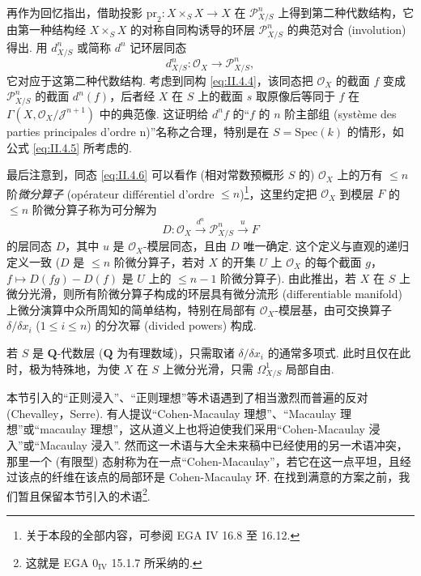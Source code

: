 \begin{remark}
再作为回忆指出，借助投影 $\mathrm{pr}_2 \colon X \times_S X \to X$ 在 $\mathcal{P}_{X/S}^{n}$ 上得到第二种代数结构，它由第一种结构经 $X \times_S X$ 的对称自同构诱导的环层 $\mathcal{P}_{X/S}^{n}$ 的典范对合 (involution) 得出. 用 $d_{X/S}^{n}$ 或简称 $d^n$ 记环层同态
\begin{equation}
d_{X/S}^{n} \colon \mathcal{O}_X \longrightarrow \mathcal{P}_{X/S}^{n}, \tag{4.6}
\label{eq:II.4.6}
\end{equation}
它对应于这第二种代数结构. 考虑到同构 \eqref{eq:II.4.4}，该同态把 $\mathcal{O}_X$ 的截面 $f$ 变成 $\mathcal{P}_{X/S}^{n}$ 的截面 $d^n(f)$，后者经 $X$ 在 $S$ 上的截面 $s$ 取原像后等同于 $f$ 在 $\Gamma(X, \mathcal{O}_X/\mathcal{J}^{n+1})$ 中的典范像. 这证明给 $d^n f$ 的``$f$ 的 $n$ 阶主部组 (système des parties principales d'ordre n)''名称之合理，特别是在 $S = \mathrm{Spec}(k)$ 的情形，如公式 \eqref{eq:II.4.5} 所考虑的.

最后注意到，同态 \eqref{eq:II.4.6} 可以看作 (相对常数预概形 $S$ 的) $\mathcal{O}_X$ 上的万有 $\leqslant n$ 阶\emph{微分算子} (opérateur différentiel d'ordre $\leqslant n$)\footnote{关于本段的全部内容，可参阅 EGA IV 16.8 至 16.12.}，这里约定把 $\mathcal{O}_X$ 到模层 $F$ 的 $\leqslant n$ 阶微分算子称为可分解为
\[
D \colon \mathcal{O}_X \xrightarrow{d^n} \mathcal{P}_{X/S}^{n} \xrightarrow{u} F
\]
的层同态 $D$，其中 $u$ 是 $\mathcal{O}_X$-模层同态，且由 $D$ 唯一确定. 这个定义与直观的递归定义一致 ($D$ 是 $\leqslant n$ 阶微分算子，若对 $X$ 的开集 $U$ 上 $\mathcal{O}_X$ 的每个截面 $g$，$f \mapsto D(fg) - D(f)$ 是 $U$ 上的 $\leqslant n-1$ 阶微分算子). 由此推出，若 $X$ 在 $S$ 上微分光滑，则所有阶微分算子构成的环层具有微分流形 (differentiable manifold) 上微分演算中众所周知的简单结构，特别在局部有 $\mathcal{O}_X$-模层基，由可交换算子 $\delta/\delta x_i$ ($1 \leqslant i \leqslant n$) 的分次幂 (divided powers) 构成.

若 $S$ 是 $\mathbf{Q}$-代数层 ($\mathbf{Q}$ 为有理数域)，只需取诸 $\delta/\delta x_i$ 的通常多项式. 此时且仅在此时，极为特殊地，为使 $X$ 在 $S$ 上微分光滑，只需 $\varOmega_{X/S}^{1}$ 局部自由.
\end{remark}
\endgroup

\begin{remark}\label{rem:II.4.19}
本节引入的``正则浸入''、``正则理想''等术语遇到了相当激烈而普遍的反对 (Chevalley，Serre). 有人提议``Cohen-Macaulay 理想''、``Macaulay 理想''或``macaulay 理想''，这从道义上也将迫使我们采用``Cohen-Macaulay 浸入''或``Macaulay 浸入''. 然而这一术语与大全未来稿中已经使用的另一术语冲突，那里一个 (有限型) 态射称为在一点``Cohen-Macaulay''，若它在这一点平坦，且经过该点的纤维在该点的局部环是 Cohen-Macaulay 环. 在找到满意的方案之前，我们暂且保留本节引入的术语\footnote{这就是 EGA 0$_{\mathrm{IV}}$ 15.1.7 所采纳的.}.
\end{remark}

